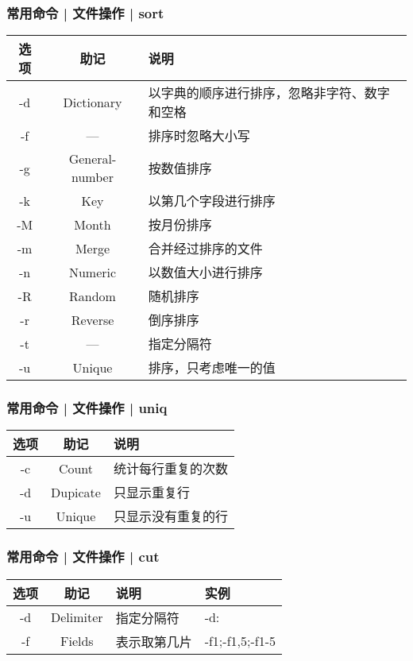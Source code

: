 \begin{frame}
  \frametitle{常用命令 | 文件操作 | \alert{sort}}
  \begin{table}
    \centering
    \begin{tabularx}{0.9\textwidth}{ccX}
      \hline
      \rowcolor{blue!50}选项 & 助记 & 说明\\
      \hline
      -d & Dictionary & 以字典的顺序进行排序，忽略非字符、数字和空格\\
      -f & --- & 排序时忽略大小写\\
      -g & General-number & 按数值排序\\
      -k & Key & 以第几个字段进行排序\\
      -M & Month & 按月份排序\\
      -m & Merge & 合并经过排序的文件\\
      -n & Numeric & 以数值大小进行排序\\
      -R & Random & 随机排序\\
      -r & Reverse & 倒序排序\\
      -t & --- & 指定分隔符\\
      -u & Unique & 排序，只考虑唯一的值\\
      \hline
    \end{tabularx}
  \end{table}
\end{frame}

\begin{frame}
  \frametitle{常用命令 | 文件操作 | \alert{uniq}}
  \begin{table}
    \centering
    \begin{tabularx}{0.9\textwidth}{ccX}
      \hline
      \rowcolor{blue!50}选项 & 助记 & 说明\\
      \hline
      -c & Count & 统计每行重复的次数\\
      -d & Dupicate & 只显示重复行\\
      -u & Unique & 只显示没有重复的行\\
      \hline
    \end{tabularx}
  \end{table}
\end{frame}

\begin{frame}
  \frametitle{常用命令 | 文件操作 | \alert{cut}}
  \begin{table}
    \centering
    \begin{tabularx}{0.9\textwidth}{cclX}
      \hline
      \rowcolor{blue!50}选项 & 助记 & 说明 & 实例\\
      \hline
      -d & Delimiter & 指定分隔符 & -d:\\
      -f & Fields & 表示取第几片 & -f1;-f1,5;-f1-5\\
      \hline
    \end{tabularx}
  \end{table}
\end{frame}

